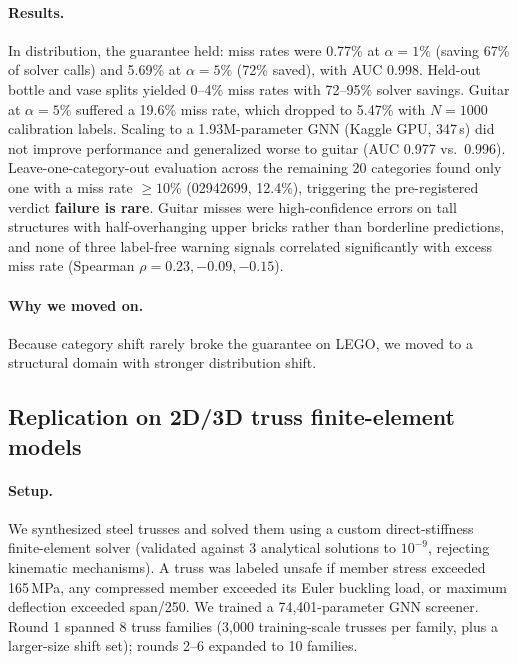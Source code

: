 \documentclass{article}
\begin{document}
\paragraph{Results.} In distribution, the guarantee held: miss rates were 0.77\% at $\alpha{=}1\%$ (saving 67\% of solver calls) and 5.69\% at $\alpha{=}5\%$ (72\% saved), with AUC 0.998. Held-out bottle and vase splits yielded 0--4\% miss rates with 72--95\% solver savings. Guitar at $\alpha{=}5\%$ suffered a 19.6\% miss rate, which dropped to 5.47\% with $N{=}1000$ calibration labels. Scaling to a 1.93M-parameter GNN (Kaggle GPU, 347\,s) did not improve performance and generalized worse to guitar (AUC 0.977 vs.\ 0.996). Leave-one-category-out evaluation across the remaining 20 categories found only one with a miss rate $\geq 10\%$ (02942699, 12.4\%), triggering the pre-registered verdict \textbf{failure is rare}. Guitar misses were high-confidence errors on tall structures with half-overhanging upper bricks rather than borderline predictions, and none of three label-free warning signals correlated significantly with excess miss rate (Spearman $\rho = 0.23, -0.09, -0.15$).

\paragraph{Why we moved on.} Because category shift rarely broke the guarantee on LEGO, we moved to a structural domain with stronger distribution shift.

\subsection{Replication on 2D/3D truss finite-element models}
\label{ex:truss}
\paragraph{Setup.} We synthesized steel trusses and solved them using a custom direct-stiffness finite-element solver (validated against 3 analytical solutions to $10^{-9}$, rejecting kinematic mechanisms). A truss was labeled unsafe if member stress exceeded 165\,MPa, any compressed member exceeded its Euler buckling load, or maximum deflection exceeded span/250. We trained a 74{,}401-parameter GNN screener. Round 1 spanned 8 truss families (3{,}000 training-scale trusses per family, plus a larger-size shift set); rounds 2--6 expanded to 10 families.
\end{document}
